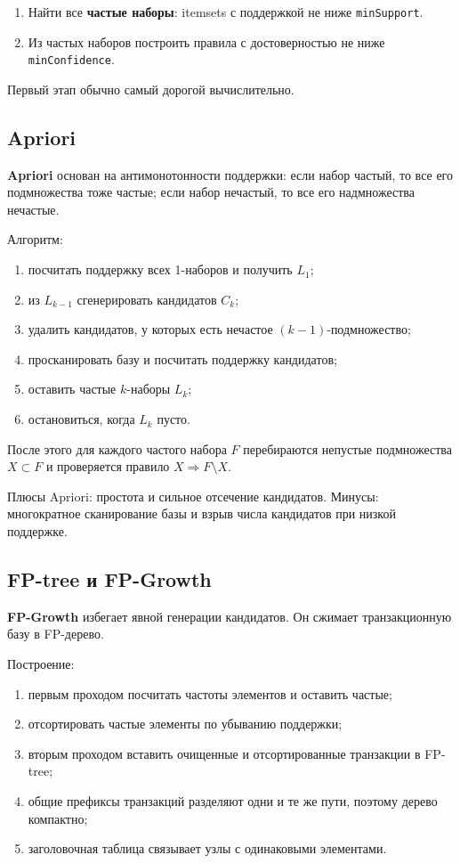 \begin{enumerate}
    \item Найти все \textbf{частые наборы}: itemsets с поддержкой не ниже \texttt{minSupport}.
    \item Из частых наборов построить правила с достоверностью не ниже \texttt{minConfidence}.
\end{enumerate}

Первый этап обычно самый дорогой вычислительно.

\subsection*{Apriori}

\textbf{Apriori} основан на антимонотонности поддержки: если набор частый, то все его подмножества тоже частые; если набор нечастый, то все его надмножества нечастые.

Алгоритм:
\begin{enumerate}
    \item посчитать поддержку всех 1-наборов и получить $L_1$;
    \item из $L_{k-1}$ сгенерировать кандидатов $C_k$;
    \item удалить кандидатов, у которых есть нечастое $(k-1)$-подмножество;
    \item просканировать базу и посчитать поддержку кандидатов;
    \item оставить частые $k$-наборы $L_k$;
    \item остановиться, когда $L_k$ пусто.
\end{enumerate}

После этого для каждого частого набора $F$ перебираются непустые подмножества $X\subset F$ и проверяется правило $X\Rightarrow F\setminus X$.

Плюсы Apriori: простота и сильное отсечение кандидатов. Минусы: многократное сканирование базы и взрыв числа кандидатов при низкой поддержке.

\subsection*{FP-tree и FP-Growth}

\textbf{FP-Growth} избегает явной генерации кандидатов. Он сжимает транзакционную базу в FP-дерево.

Построение:
\begin{enumerate}
    \item первым проходом посчитать частоты элементов и оставить частые;
    \item отсортировать частые элементы по убыванию поддержки;
    \item вторым проходом вставить очищенные и отсортированные транзакции в FP-tree;
    \item общие префиксы транзакций разделяют одни и те же пути, поэтому дерево компактно;
    \item заголовочная таблица связывает узлы с одинаковыми элементами.
\end{enumerate}

